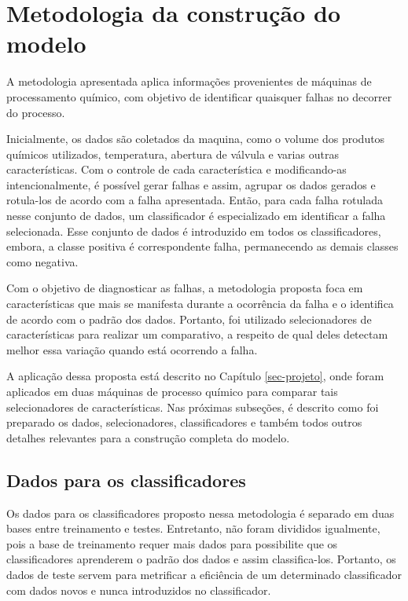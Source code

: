 \chapter{Metodologia da construção do modelo}
\label{sec-requisitos}

A metodologia apresentada aplica informações provenientes de máquinas de processamento químico, com objetivo de identificar quaisquer falhas no decorrer do processo.

Inicialmente, os dados são coletados da maquina, como o volume dos produtos químicos utilizados, temperatura, abertura de válvula e varias outras características. Com o controle de cada característica e modificando-as intencionalmente, é possível gerar falhas e assim, agrupar os dados gerados e rotula-los de acordo com a falha apresentada. Então, para cada falha rotulada nesse conjunto de dados, um classificador é especializado em identificar a falha selecionada. Esse conjunto de dados é introduzido em todos os classificadores, embora, a classe positiva é correspondente falha, permanecendo as demais classes como negativa.

Com o objetivo de diagnosticar as falhas, a metodologia proposta foca em características que mais se manifesta durante a ocorrência da falha e o identifica de acordo com o padrão dos dados. Portanto, foi utilizado selecionadores de características para realizar um comparativo, a respeito de qual deles detectam melhor essa variação quando está ocorrendo a falha.

A aplicação dessa proposta está descrito no Capítulo \ref{sec-projeto}, onde foram aplicados em duas máquinas de processo químico para comparar tais selecionadores de características. Nas próximas subseções, é descrito como foi preparado os dados, selecionadores, classificadores e também todos outros detalhes relevantes para a construção completa do modelo.

\section{Dados para os classificadores}

Os dados para os classificadores proposto nessa metodologia é separado em duas bases entre treinamento e testes. Entretanto, não foram divididos igualmente, pois a base de treinamento requer mais dados para possibilite que os classificadores aprenderem o padrão dos dados e assim classifica-los. Portanto, os dados de teste servem para metrificar a eficiência de um determinado classificador com dados novos e nunca introduzidos no classificador.

